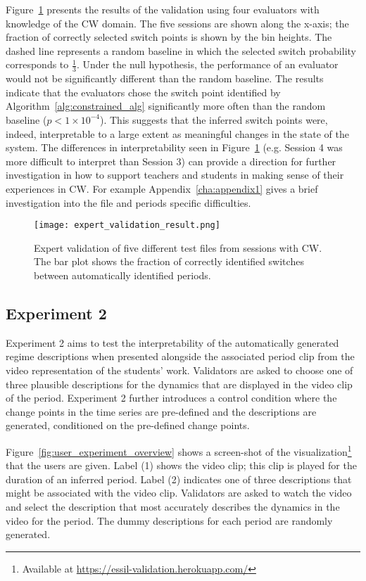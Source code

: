 Figure~\ref{fig:results_expert_validation} presents the results of the validation using four evaluators with knowledge of the CW domain. The five sessions are shown along the x-axis; the fraction of correctly selected switch points is shown by the bin heights. The dashed line represents a random baseline in which the selected switch probability corresponds to $\frac{1}{3}$. Under the null hypothesis, the performance of an evaluator would not be significantly different than the random baseline. The results indicate that the evaluators chose the switch point identified by Algorithm~\ref{alg:constrained_alg} significantly more often than the random baseline ($p < 1\times 10^{-4}$). This suggests that the inferred switch points were, indeed, interpretable to a large extent as meaningful changes in the state of the system. The differences in interpretability seen in Figure~\ref{fig:results_expert_validation} (e.g. Session 4 was more difficult to interpret than Session 3) can provide a direction for further investigation in how to support teachers and students in making sense of their experiences in CW. For example Appendix~\ref{cha:appendix1} gives a brief investigation into the file and periods specific difficulties.

\begin{figure}
\centering
\texttt{[image: expert\_validation\_result.png]}
\caption{Expert validation of five different test files from sessions with CW. The bar plot shows the fraction of correctly identified switches between automatically identified periods.}
\label{fig:results_expert_validation}
\end{figure}

\subsection{Experiment 2}\label{sec:experiment2-empirical-validation}

Experiment 2 aims to test the interpretability of the automatically generated regime descriptions when presented alongside the associated period clip from the video representation of the students' work. Validators are asked to choose one of three plausible descriptions for the dynamics that are displayed in the video clip of the period. Experiment 2 further introduces a control condition where the change points in the time series are pre-defined and the descriptions are generated, conditioned on the pre-defined change points.

Figure~\ref{fig:user_experiment_overview} shows a screen-shot of the visualization\footnote{Available at \url{https://essil-validation.herokuapp.com/}} that the users are given. Label (1) shows the video clip; this clip is played for the duration of an inferred period. Label (2) indicates one of three descriptions that might be associated with the video clip. Validators are asked to watch the video and select the description that most accurately describes the dynamics in the video for the period. The dummy descriptions for each period are randomly generated.

